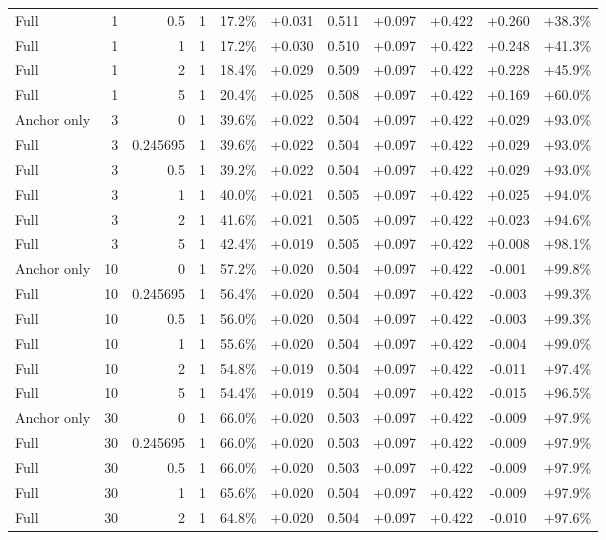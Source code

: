 \begin{table}[htbp]
\begin{tabular}{lrrrccccccc}
Full & 1 & 0.5 & 1 & 17.2\% & +0.031 & 0.511 & +0.097 & +0.422 & +0.260 & +38.3\% \\
Full & 1 & 1 & 1 & 17.2\% & +0.030 & 0.510 & +0.097 & +0.422 & +0.248 & +41.3\% \\
Full & 1 & 2 & 1 & 18.4\% & +0.029 & 0.509 & +0.097 & +0.422 & +0.228 & +45.9\% \\
Full & 1 & 5 & 1 & 20.4\% & +0.025 & 0.508 & +0.097 & +0.422 & +0.169 & +60.0\% \\
Anchor only & 3 & 0 & 1 & 39.6\% & +0.022 & 0.504 & +0.097 & +0.422 & +0.029 & +93.0\% \\
Full & 3 & 0.245695 & 1 & 39.6\% & +0.022 & 0.504 & +0.097 & +0.422 & +0.029 & +93.0\% \\
Full & 3 & 0.5 & 1 & 39.2\% & +0.022 & 0.504 & +0.097 & +0.422 & +0.029 & +93.0\% \\
Full & 3 & 1 & 1 & 40.0\% & +0.021 & 0.505 & +0.097 & +0.422 & +0.025 & +94.0\% \\
Full & 3 & 2 & 1 & 41.6\% & +0.021 & 0.505 & +0.097 & +0.422 & +0.023 & +94.6\% \\
Full & 3 & 5 & 1 & 42.4\% & +0.019 & 0.505 & +0.097 & +0.422 & +0.008 & +98.1\% \\
Anchor only & 10 & 0 & 1 & 57.2\% & +0.020 & 0.504 & +0.097 & +0.422 & -0.001 & +99.8\% \\
Full & 10 & 0.245695 & 1 & 56.4\% & +0.020 & 0.504 & +0.097 & +0.422 & -0.003 & +99.3\% \\
Full & 10 & 0.5 & 1 & 56.0\% & +0.020 & 0.504 & +0.097 & +0.422 & -0.003 & +99.3\% \\
Full & 10 & 1 & 1 & 55.6\% & +0.020 & 0.504 & +0.097 & +0.422 & -0.004 & +99.0\% \\
Full & 10 & 2 & 1 & 54.8\% & +0.019 & 0.504 & +0.097 & +0.422 & -0.011 & +97.4\% \\
Full & 10 & 5 & 1 & 54.4\% & +0.019 & 0.504 & +0.097 & +0.422 & -0.015 & +96.5\% \\
Anchor only & 30 & 0 & 1 & 66.0\% & +0.020 & 0.503 & +0.097 & +0.422 & -0.009 & +97.9\% \\
Full & 30 & 0.245695 & 1 & 66.0\% & +0.020 & 0.503 & +0.097 & +0.422 & -0.009 & +97.9\% \\
Full & 30 & 0.5 & 1 & 66.0\% & +0.020 & 0.503 & +0.097 & +0.422 & -0.009 & +97.9\% \\
Full & 30 & 1 & 1 & 65.6\% & +0.020 & 0.504 & +0.097 & +0.422 & -0.009 & +97.9\% \\
Full & 30 & 2 & 1 & 64.8\% & +0.020 & 0.504 & +0.097 & +0.422 & -0.010 & +97.6\% \\

\end{tabular}
\end{table}
